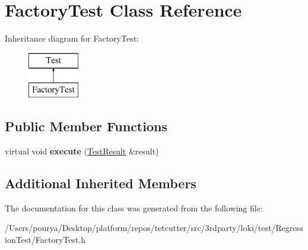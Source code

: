 \hypertarget{classFactoryTest}{}\section{Factory\+Test Class Reference}
\label{classFactoryTest}
Inheritance diagram for Factory\+Test\+:\begin{figure}[H]
\begin{center}
\leavevmode
\includegraphics[height=2.000000cm]{classFactoryTest}
\end{center}
\end{figure}
\subsection*{Public Member Functions}
\begin{DoxyCompactItemize}
\item 
\hypertarget{classFactoryTest_af2374a18b473ae2fee16cce130672424}{}virtual void {\bfseries execute} (\hyperlink{classTestResult}{Test\+Result} \&result)\label{classFactoryTest_af2374a18b473ae2fee16cce130672424}

\end{DoxyCompactItemize}
\subsection*{Additional Inherited Members}


The documentation for this class was generated from the following file\+:\begin{DoxyCompactItemize}
\item 
/\+Users/pourya/\+Desktop/platform/repos/tetcutter/src/3rdparty/loki/test/\+Regression\+Test/Factory\+Test.\+h\end{DoxyCompactItemize}
